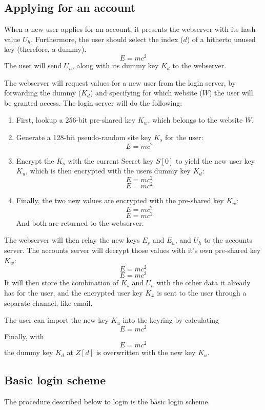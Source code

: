 \subsection{Applying for an account}
\label{sec:applying}
When a new user applies for an account,
it presents the webserver with its hash value $U_h$.
Furthermore,
the user should select the index ($d$) of a hitherto unused key
(therefore, a dummy).
\[E=mc^2\]
The user will send $U_h$, along with its dummy key $K_d$ to the webserver.
\par
The webserver will request values for a new user from the login server,
by forwarding the dummy ($K_d$) and
specifying for which website ($W$) the user will be granted access.
The login server will do the following:
\begin{enumerate}
\item First,
	lookup a 256-bit pre-shared key $K_w$,
	which belongs to the website $W$.
\item Generate a 128-bit pseudo-random site key $K_s$ for the user:
\[E=mc^2\]
\item Encrypt the $K_s$ with the current Secret key $S[0]$ to yield the new user key $K_u$,
which is then encrypted with the users dummy key $K_d$:
\[E=mc^2\]
\[E=mc^2\]
\item Finally, the two new values are encrypted with the pre-shared key $K_w$:
\[E=mc^2\]
\[E=mc^2\]
And both are returned to the webserver.
\end{enumerate}
The webserver will then relay the new keys $E_s$ and $E_u$, and $U_h$ to the accounts server.
The accounts server will decrypt those values with it's own pre-shared key $K_w$:
\[E=mc^2\]
\[E=mc^2\]
It will then store the combination of $K_s$ and $U_h$ with the other data it already has for the user,
and the encrypted user key $K_x$ is sent to the user through a separate channel,
like email.
\par
The user can import the new key $K_u$ into the keyring by calculating
\[E=mc^2\]
Finally, with
\[E=mc^2\]
the dummy key $K_d$ at $Z[d]$ is overwritten with the new key $K_u$.

\subsection{Basic login scheme}
The procedure described below to login is the basic login scheme.

